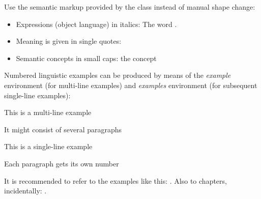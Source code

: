 \documentclass[naustrian,english,pdfa]{univie-ling-thesis}
\begin{document}
Use the semantic markup provided by the class instead of manual shape change:
\begin{itemize}
	\item Expressions (object language) in italics: The word .
	\item Meaning is given in single quotes: 
	\item Semantic concepts in small caps: the concept 
\end{itemize}
%
Numbered linguistic examples can be produced by means of the \emph{example} environment (for multi-line examples) and \emph{examples} environment
(for subsequent single-line examples):

\begin{example}
	This is a multi-line example
	
	It might consist of several paragraphs
\end{example}

\begin{examples}
	\item This is a single-line example\label{exa:example-single}
	\item Each paragraph gets its own number
\end{examples}
%
It is recommended to refer to the examples like this: . Also to chapters, incidentally: .

\printbibliography[heading=bibnumbered]
\end{document}
